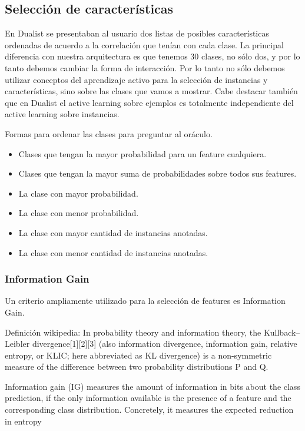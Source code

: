 \subsection{Selección de características}
En Dualist se presentaban al usuario dos listas de posibles características ordenadas de acuerdo a la correlación que tenían con cada clase. La principal diferencia con nuestra arquitectura es que tenemos 30 clases, no sólo dos, y por lo tanto debemos cambiar la forma de interacción. Por lo tanto no sólo debemos utilizar conceptos del aprendizaje activo para la selección de instancias y características, sino sobre las clases que vamos a mostrar. Cabe destacar también que en Dualist el active learning sobre ejemplos es totalmente independiente
del active learning sobre instancias.

Formas para ordenar las clases para preguntar al oráculo.
\begin{itemize}
	\item Clases que tengan la mayor probabilidad para un feature cualquiera.
	\item Clases que tengan la mayor suma de probabilidades sobre todos sus features.
	\item La clase con mayor probabilidad.
	\item La clase con menor probabilidad.
	\item La clase con mayor cantidad de instancias anotadas.
	\item La clase con menor cantidad de instancias anotadas.
\end{itemize}

\subsubsection{Information Gain}
Un criterio ampliamente utilizado para la selección de features es Information Gain.

Definición wikipedia:
In probability theory and information theory, the Kullback–Leibler divergence[1][2][3] (also information divergence, information gain, relative entropy, or KLIC; here abbreviated as KL divergence) is a non-symmetric measure of the difference between two probability distributions P and Q.

\citet{infgain}
Information gain (IG) measures the amount of information in bits about the
class prediction, if the only information available is the presence of a feature
and the corresponding class distribution. Concretely, it measures the expected
reduction in entropy

